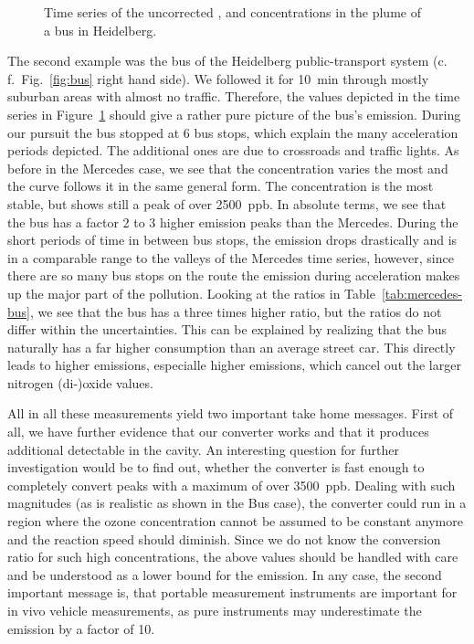 \begin{figure}[htbp]
  \centering
  
  \caption{Time series of the uncorrected ,  and 
    concentrations in the plume of a bus in Heidelberg.}
  \label{fig:bus-ts}
\end{figure}

The second example was the bus of the Heidelberg public-transport
system (c.\,f.\ Fig.~\ref{fig:bus} right hand side). We followed it
for \SI{10}{\minute} through mostly suburban
areas with almost no traffic. Therefore, the values depicted in the
time series in Figure~\ref{fig:bus-ts} should give a rather pure
picture of the bus's emission. During our pursuit the bus stopped at 6
bus stops, which explain the many acceleration periods depicted. The
additional ones are due to crossroads and traffic
lights. As before in the Mercedes case, we see that the 
concentration varies the most and the  curve follows it
in the same general form. The  concentration is the most
stable, but shows still a peak of over \SI{2500}{ppb}. In absolute
terms, we see that the bus has a factor 2 to 3 higher 
emission peaks than the Mercedes. During the short periods of time in
between bus stops, the emission drops drastically and is in a
comparable range to the valleys of the Mercedes time series, however,
since there are so many bus stops on the route the emission during
acceleration makes up the major part of the pollution. Looking at the
ratios in Table~\ref{tab:mercedes-bus}, we see that the bus has a
three times higher  ratio, but the  ratios do not
differ within the uncertainties. This can be explained by realizing
that the bus naturally has a far higher consumption than an average
street car. This directly leads to higher emissions, especialle higher
 emissions, which cancel out the larger nitrogen (di-)oxide
values.

All in all these measurements yield two important take home
messages. First of all, we have further evidence that our converter
works and that it produces additional detectable  in
the cavity. An interesting question for further investigation would be
to find out, whether the converter is fast enough to completely
convert  peaks with a maximum of over \SI{3500}{ppb}. Dealing
with such magnitudes (as is realistic as shown in the Bus case), the
converter could run in a region where the ozone concentration cannot
be assumed to be constant anymore and the reaction speed should
diminish. Since we do not know the conversion ratio for such high
concentrations, the above  values should be handled with care
and be understood as a lower bound for the emission. In any case, the
second important message is, that portable  measurement
instruments are important for in vivo vehicle measurements, as pure
 instruments may underestimate the  emission by a
factor of 10.

